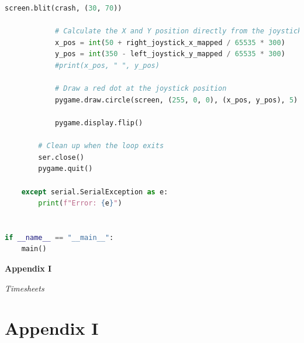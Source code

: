 \documentclass[conference]{IEEEtran}
\begin{document}
\begin{lstlisting}[language=Python, caption=RC Wheelchair Test Application, label=wheelchair_test_code]
            screen.blit(crash, (30, 70))

            # Calculate the X and Y position directly from the joystick values, centered at (200, 200)
            x_pos = int(50 + right_joystick_x_mapped / 65535 * 300)
            y_pos = int(350 - left_joystick_y_mapped / 65535 * 300)
            #print(x_pos, " ", y_pos)

            # Draw a red dot at the joystick position
            pygame.draw.circle(screen, (255, 0, 0), (x_pos, y_pos), 5)

            pygame.display.flip()

        # Clean up when the loop exits
        ser.close()
        pygame.quit()

    except serial.SerialException as e:
        print(f"Error: {e}")


if __name__ == "__main__":
    main()
    \end{lstlisting}


\clearpage
\onecolumn
\begin{center}
    \vspace*{5cm}
     {\Huge\bfseries Appendix I \par}
     \vspace{1cm}
    \textit{Timesheets} \\
\end{center}
\clearpage

\setcounter{section}{9}
\renewcommand{\thesubsection}{I.\Alph{subsection}}
\section*{\textbf{Appendix I}}
        \setcounter{figure}{0}
        \renewcommand{\thefigure}{I.\arabic{figure}}
        \setcounter{table}{0}
        \renewcommand{\thetable}{I.\arabic{table}}
        \setcounter{subsection}{0}
\end{document}
